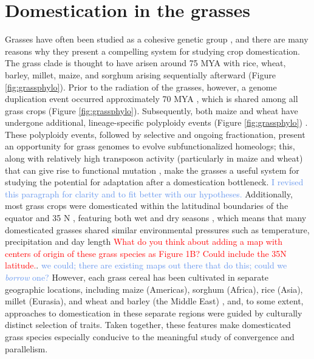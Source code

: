 \documentclass[12pt]{article}
\newcommand{\mbh}[1]{\textcolor{red}{\normalsize  #1}}
\newcommand{\mw}[1]{\textcolor{cornflowerblue}{\normalsize #1}}
\begin{document}
\section*{Domestication in the grasses}
Grasses have often been studied as a cohesive genetic group \citep{pmid8379002, pmid11244100}, and there are many reasons why they present a compelling system for studying crop domestication.
The grass clade is thought to have arisen around 75 MYA \citep{BOUCHENAKKHELLADI2010, Kellogg2001} with rice, wheat, barley, millet, maize, and sorghum arising sequentially afterward (Figure \ref{fig:grassphylo}).
Prior to the radiation of the grasses, however, a genome duplication event occurred approximately 70 MYA \citep{Paterson2004}, which is shared among all grass crops (Figure \ref{fig:grassphylo}).
Subsequently, both maize and wheat have undergone additional, lineage-specific polyploidy events (Figure \ref{fig:grassphylo}) \citep{Levy2002}.
These polyploidy events, followed by selective and ongoing fractionation, present an opportunity for grass genomes to evolve subfunctionalized homeologs; this, along with relatively high transposon activity (particularly in maize and wheat) that can give rise to functional mutation \citep{Wicker2016, Lisch2001}, make the grasses a useful system for studying the potential for adaptation after a domestication bottleneck. \mw{I revised this paragraph for clarity and to fit better with our hypotheses.}
Additionally, most grass crops were domesticated within the latitudinal boundaries of the equator and 35 N \citep{Jain1993, Gepts2010}, featuring both wet and dry seasons \citep{Jain1993}, which means that many domesticated grasses shared similar environmental pressures such as temperature, precipitation and day length \mbh{What do you think about adding a map with centers of origin of these grass species as Figure 1B?  Could include the 35N latitude.}. \mw{we could; there are existing maps out there that do this; could we \emph{borrow} one?}
However, each grass cereal has been cultivated in separate geographic locations, including maize (Americas), sorghum (Africa), rice (Asia), millet (Eurasia), and wheat and barley (the Middle East) \citep{Glmin2009}, and, to some extent, approaches to domestication in these separate regions were guided by culturally distinct selection of traits.
Taken together, these features make domesticated grass species especially conducive to the meaningful study of convergence and parallelism.
\end{document}
